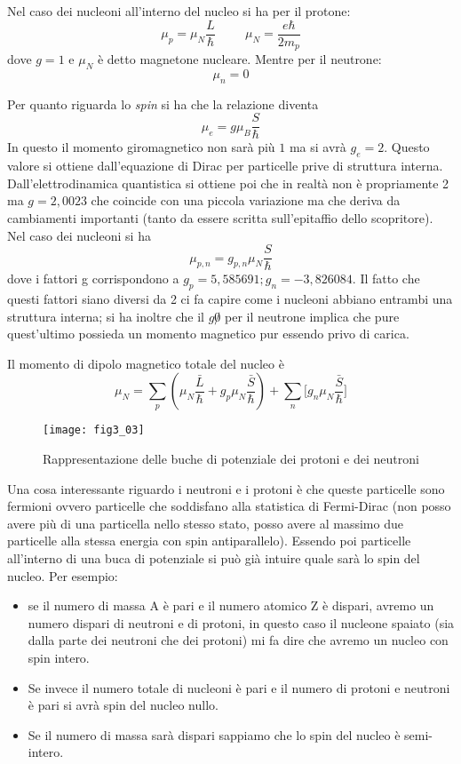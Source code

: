 Nel caso dei nucleoni all'interno del nucleo si ha per il protone:
\begin{equation}
\mu_p=\mu_N\frac{L}{\hbar}\hspace{1cm}\mu_N=\frac{e\hbar}{2m_p}
\end{equation}
dove $g=1$ e $\mu_N$ è detto magnetone nucleare.
Mentre per il neutrone:
\begin{equation}
\mu_n=0
\end{equation}

Per quanto riguarda lo \emph{spin} si ha che la relazione diventa
\begin{equation}
\mu_e=g\mu_B \frac{S}{\hbar}
\end{equation}
In questo il momento giromagnetico non sarà più $1$ ma si avrà $g_e=2$.
Questo valore si ottiene dall'equazione di Dirac per particelle prive di struttura interna.
Dall'elettrodinamica quantistica si ottiene poi che in realtà non è propriamente 2 ma $g=2,0023$ che coincide con una piccola variazione ma che deriva da cambiamenti importanti (tanto da essere scritta sull'epitaffio dello scopritore).
Nel caso dei nucleoni si ha
\begin{equation}
\mu_{p,n}=g_{p,n}\mu_N\frac{S}{\hbar}
\end{equation}
dove i fattori g corrispondono a $g_p=5,585691; g_n=-3,826084$.
Il fatto che questi fattori siano diversi da 2 ci fa capire come i nucleoni abbiano entrambi una struttura interna; si ha inoltre che il $g\not0$ per il neutrone implica che pure quest'ultimo possieda un momento magnetico pur essendo privo di carica.

Il momento di dipolo magnetico totale del nucleo è
\begin{equation}
\mu_N=\sum_p \left(\mu_N \frac{\bar{L}}{\hbar}+g_p\mu_N\frac{\bar S}{\hbar}\right)+\sum_n \biggl[g_n \mu_N\frac{\bar S}{\hbar}\biggl]
\end{equation}
\begin{figure}[h]
\centering
\texttt{[image: fig3\_03]}
\caption{Rappresentazione delle buche di potenziale dei protoni e dei neutroni}
\end{figure}
Una cosa interessante riguardo i neutroni e i protoni è che queste particelle sono fermioni ovvero particelle che soddisfano alla statistica di Fermi-Dirac (non posso avere più di una particella nello stesso stato, posso avere al massimo due particelle alla stessa energia con spin antiparallelo).
Essendo poi particelle all'interno di una buca di potenziale si può già intuire quale sarà lo spin del nucleo.
Per esempio:
\begin{itemize}
\item se il numero di massa A è pari e il numero atomico Z è dispari, avremo un numero dispari di neutroni e di protoni, in questo caso il nucleone spaiato (sia dalla parte dei neutroni che dei protoni) mi fa dire che avremo un nucleo con spin intero.
\item Se invece il numero totale di nucleoni è pari e il numero di protoni e neutroni è pari si avrà spin del nucleo nullo.
\item Se il numero di massa sarà dispari sappiamo che lo spin del nucleo è semi-intero.
\end{itemize} 